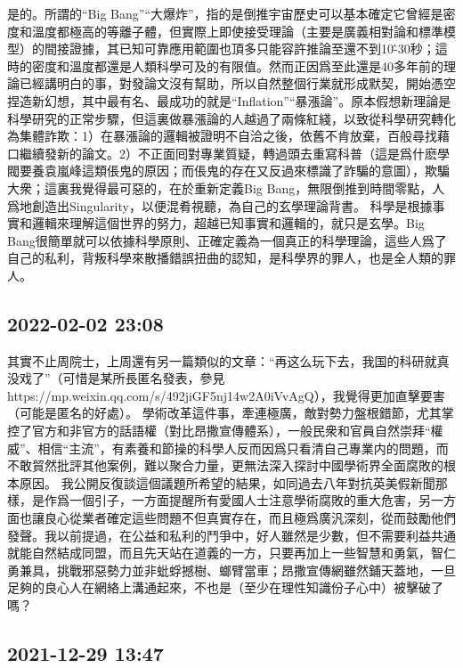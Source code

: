 \documentclass[twocolumn]{ctexart}
\begin{document}
是的。所謂的“Big Bang”“大爆炸”，指的是倒推宇宙歷史可以基本確定它曾經是密度和溫度都極高的等離子體，但實際上即使接受理論（主要是廣義相對論和標準模型）的間接證據，其已知可靠應用範圍也頂多只能容許推論至還不到10\^-30秒；這時的密度和溫度都還是人類科學可及的有限值。然而正因爲至此還是40多年前的理論已經講明白的事，對發論文沒有幫助，所以自然整個行業就形成默契，開始憑空捏造新幻想，其中最有名、最成功的就是“Inflation”“暴漲論”。原本假想新理論是科學研究的正常步驟，但這裏做暴漲論的人越過了兩條紅綫，以致從科學研究轉化為集體詐欺：1）在暴漲論的邏輯被證明不自洽之後，依舊不肯放棄，百般尋找藉口繼續發新的論文。2）不正面囘對專業質疑，轉過頭去重寫科普（這是爲什麽學閥要養袁嵐峰這類倀鬼的原因；而倀鬼的存在又反過來標識了詐騙的意圖），欺騙大衆；這裏我覺得最可惡的，在於重新定義Big Bang，無限倒推到時間零點，人爲地創造出Singularity，以便混肴視聽，為自己的玄學理論背書。
科學是根據事實和邏輯來理解這個世界的努力，超越已知事實和邏輯的，就只是玄學。Big Bang很簡單就可以依據科學原則、正確定義為一個真正的科學理論，這些人爲了自己的私利，背叛科學來散播錯誤扭曲的認知，是科學界的罪人，也是全人類的罪人。
\subsection*{2022-02-02 23:08}

其實不止周院士，上周還有另一篇類似的文章：“再这么玩下去，我国的科研就真没戏了”（可惜是某所長匿名發表，參見https://mp.weixin.qq.com/s/492jiGF5nj14w2A0iVvAgQ），我覺得更加直擊要害（可能是匿名的好處）。
學術改革這件事，牽連極廣，敵對勢力盤根錯節，尤其掌控了官方和非官方的話語權（對比昂撒宣傳體系），一般民衆和官員自然崇拜“權威”、相信“主流”，有素養和節操的科學人反而因爲只看清自己專業内的問題，而不敢貿然批評其他案例，難以聚合力量，更無法深入探討中國學術界全面腐敗的根本原因。
我公開反復談這個議題所希望的結果，如同過去八年對抗英美假新聞那樣，是作爲一個引子，一方面提醒所有愛國人士注意學術腐敗的重大危害，另一方面也讓良心從業者確定這些問題不但真實存在，而且極爲廣汎深刻，從而鼓勵他們發聲。我以前提過，在公益和私利的鬥爭中，好人雖然是少數，但不需要利益共通就能自然結成同盟，而且先天站在道義的一方，只要再加上一些智慧和勇氣，智仁勇兼具，挑戰邪惡勢力並非蚍蜉撼樹、螂臂當車；昂撒宣傳網雖然鋪天蓋地，一旦足夠的良心人在網絡上溝通起來，不也是（至少在理性知識份子心中）被擊破了嗎？
\subsection*{2021-12-29 13:47}
\end{document}
